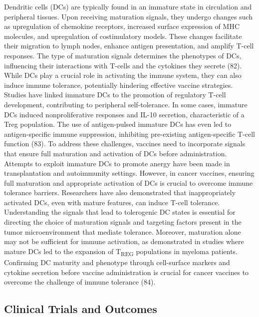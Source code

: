 \documentclass[
]{article}
\begin{document}
Dendritic cells (DCs) are typically found in an immature state in
circulation and peripheral tissues. Upon receiving maturation signals,
they undergo changes such as upregulation of chemokine receptors,
increased surface expression of MHC molecules, and upregulation of
costimulatory models. These changes facilitate their migration to lymph
nodes, enhance antigen presentation, and amplify T-cell responses. The
type of maturation signals determines the phenotypes of DCs, influencing
their interactions with T-cells and the cytokines they secrete (82).
While DCs play a crucial role in activating the immune system, they can
also induce immune tolerance, potentially hindering effective vaccine
strategies. Studies have linked immature DCs to the promotion of
regulatory T-cell development, contributing to peripheral
self-tolerance. In some cases, immature DCs induced nonproliferative
responses and IL-10 secretion, characteristic of a Treg population. The
use of antigen-pulsed immature DCs has even led to antigen-specific
immune suppression, inhibiting pre-existing antigen-specific T-cell
function (83). To address these challenges, vaccines need to incorporate
signals that ensure full maturation and activation of DCs before
administration. Attempts to exploit immature DCs to promote anergy have
been made in transplantation and autoimmunity settings. However, in
cancer vaccines, ensuring full maturation and appropriate activation of
DCs is crucial to overcome immune tolerance barriers. Researchers have
also demonstrated that inappropriately activated DCs, even with mature
features, can induce T-cell tolerance. Understanding the signals that
lead to tolerogenic DC states is essential for directing the choice of
maturation signals and targeting factors present in the tumor
microenvironment that mediate tolerance. Moreover, maturation alone may
not be sufficient for immune activation, as demonstrated in studies
where mature DCs led to the expansion of T\textsubscript{REG}
populations in myeloma patients. Confirming DC maturity and phenotype
through cell-surface markers and cytokine secretion before vaccine
administration is crucial for cancer vaccines to overcome the challenge
of immune tolerance (84).

\subsection{Clinical Trials and
Outcomes}\label{clinical-trials-and-outcomes}
\end{document}

